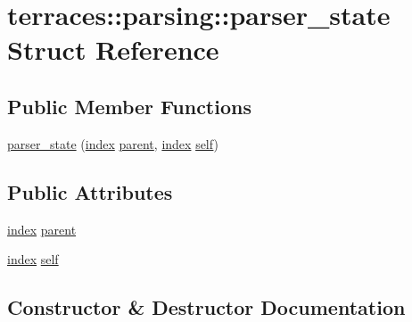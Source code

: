 \hypertarget{structterraces_1_1parsing_1_1parser__state}{}\section{terraces\+:\+:parsing\+:\+:parser\+\_\+state Struct Reference}
\label{structterraces_1_1parsing_1_1parser__state}
\subsection*{Public Member Functions}
\begin{DoxyCompactItemize}
\item 
\hyperlink{structterraces_1_1parsing_1_1parser__state_a6da424cef05b8f33368f4af9bb7c1734}{parser\+\_\+state} (\hyperlink{namespaceterraces_adbc33ccb543d1634e96d0eb02e472c77}{index} \hyperlink{structterraces_1_1parsing_1_1parser__state_a3cae4795f4aa78de14cfaf743d24d12e}{parent}, \hyperlink{namespaceterraces_adbc33ccb543d1634e96d0eb02e472c77}{index} \hyperlink{structterraces_1_1parsing_1_1parser__state_a4312748dd4f312d8f3022f485866c69c}{self})
\end{DoxyCompactItemize}
\subsection*{Public Attributes}
\begin{DoxyCompactItemize}
\item 
\hyperlink{namespaceterraces_adbc33ccb543d1634e96d0eb02e472c77}{index} \hyperlink{structterraces_1_1parsing_1_1parser__state_a3cae4795f4aa78de14cfaf743d24d12e}{parent}
\item 
\hyperlink{namespaceterraces_adbc33ccb543d1634e96d0eb02e472c77}{index} \hyperlink{structterraces_1_1parsing_1_1parser__state_a4312748dd4f312d8f3022f485866c69c}{self}
\end{DoxyCompactItemize}


\subsection{Constructor \& Destructor Documentation}
\mbox{\label{structterraces_1_1parsing_1_1parser__state_a6da424cef05b8f33368f4af9bb7c1734}} 
